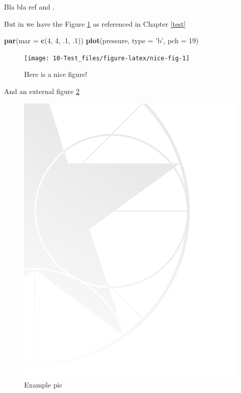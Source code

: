 \documentclass[a4paper,12pt,twoside,onecolumn,openright,final,oldfontcommands]{memoir}
\newenvironment{Shaded}{\begin{snugshade}}{\end{snugshade}}
\newcommand{\KeywordTok}[1]{\textcolor[rgb]{0.13,0.29,0.53}{\textbf{{#1}}}}
\newcommand{\DataTypeTok}[1]{\textcolor[rgb]{0.13,0.29,0.53}{{#1}}}
\newcommand{\DecValTok}[1]{\textcolor[rgb]{0.00,0.00,0.81}{{#1}}}
\newcommand{\StringTok}[1]{\textcolor[rgb]{0.31,0.60,0.02}{{#1}}}
\newcommand{\NormalTok}[1]{{#1}}
\begin{document}
Bla bla ref \citet{MBMH19} and \citep{MBMH19}.

But in \citet{BMTBC19} we have the Figure \ref{fig:nice-fig} as
referenced in Chapter \ref{test}

\begin{Shaded}
\begin{Highlighting}[]
\KeywordTok{par}\NormalTok{(}\DataTypeTok{mar =} \KeywordTok{c}\NormalTok{(}\DecValTok{4}\NormalTok{, }\DecValTok{4}\NormalTok{, .}\DecValTok{1}\NormalTok{, .}\DecValTok{1}\NormalTok{))}
\KeywordTok{plot}\NormalTok{(pressure, }\DataTypeTok{type =} \StringTok{'b'}\NormalTok{, }\DataTypeTok{pch =} \DecValTok{19}\NormalTok{)}
\end{Highlighting}
\end{Shaded}

\begin{figure}

{\centering \texttt{[image: 10-Test\_files/figure-latex/nice-fig-1]} 

}

\caption{Here is a nice figure!}\label{fig:nice-fig}
\end{figure}

And an external figure \ref{fig:test}

\begin{figure}

{\centering \includegraphics[width=0.45\linewidth]{cover/pictures/back-bg} 

}

\caption{Example pic}\label{fig:test}
\end{figure}


\end{document}
